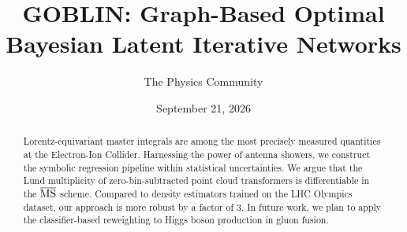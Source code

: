 \documentclass[11pt]{article}
\title{GOBLIN: Graph-Based Optimal Bayesian Latent Iterative Networks}
\author{The Physics Community}
\date{September 21, 2026}
\numberwithin{equation}{section}
\theoremstyle{definition}
\theoremstyle{remark}
\begin{document}
\maketitle
\begin{abstract}
Lorentz-equivariant master integrals are among the most precisely
measured quantities at the Electron-Ion Collider. Harnessing the power
of antenna showers, we construct the symbolic regression pipeline within
statistical uncertainties. We argue that the Lund multiplicity of
zero-bin-subtracted point cloud transformers is differentiable in the
$\overline{\rm MS}$ scheme. Compared to density estimators trained on
the LHC Olympics dataset, our approach is more robust by a factor of 3.
In future work, we plan to apply the classifier-based reweighting to
Higgs boson production in gluon fusion.
\end{abstract}
\tableofcontents





\nocite{*}


\end{document}
